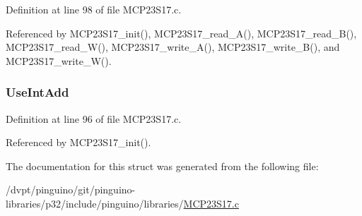 Definition at line 98 of file M\-C\-P23\-S17.\-c.



Referenced by M\-C\-P23\-S17\-\_\-init(), M\-C\-P23\-S17\-\_\-read\-\_\-\-A(), M\-C\-P23\-S17\-\_\-read\-\_\-\-B(), M\-C\-P23\-S17\-\_\-read\-\_\-\-W(), M\-C\-P23\-S17\-\_\-write\-\_\-\-A(), M\-C\-P23\-S17\-\_\-write\-\_\-\-B(), and M\-C\-P23\-S17\-\_\-write\-\_\-\-W().

\hypertarget{structtag_m_c_p23_s17_a7e6aa33b41bfbe7730c319ab6e92d2d6}{
\subsubsection[{Use\-Int\-Add}]{ Use\-Int\-Add}}\label{structtag_m_c_p23_s17_a7e6aa33b41bfbe7730c319ab6e92d2d6}


Definition at line 96 of file M\-C\-P23\-S17.\-c.



Referenced by M\-C\-P23\-S17\-\_\-init().



The documentation for this struct was generated from the following file\-:\begin{DoxyCompactItemize}
\item 
/dvpt/pinguino/git/pinguino-\/libraries/p32/include/pinguino/libraries/\hyperlink{_m_c_p23_s17_8c}{M\-C\-P23\-S17.\-c}\end{DoxyCompactItemize}
